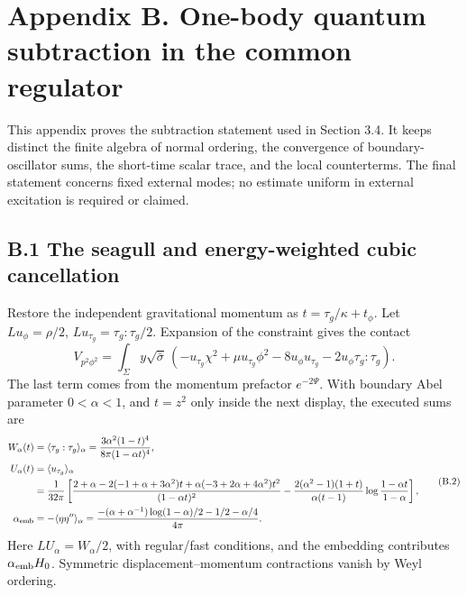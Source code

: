 \clearpage
\hypertarget{appendix-b.-one-body-quantum-subtraction-in-the-common-regulator}{%
\section{Appendix B. One-body quantum subtraction in the common regulator}\label{appendix-b.-one-body-quantum-subtraction-in-the-common-regulator}}

This appendix proves the subtraction statement used in Section 3.4. It keeps distinct the finite algebra of normal ordering, the convergence of boundary-oscillator sums, the short-time scalar trace, and the local counterterms. The final statement concerns fixed external modes; no estimate uniform in external excitation is required or claimed.

\hypertarget{b.1-the-seagull-and-energy-weighted-cubic-cancellation}{%
\subsection{B.1 The seagull and energy-weighted cubic cancellation}\label{b.1-the-seagull-and-energy-weighted-cubic-cancellation}}

Restore the independent gravitational momentum as \(t=\tau_g/\kappa+t_\phi\). Let \(Lu_\phi=\rho/2\), \(Lu_{\tau_g}=\tau_g:\tau_g/2\). Expansion of the constraint gives the contact \[
V_{p^2\phi^2}
=\int_\Sigma y\sqrt{\bar\sigma}\,
(-u_{\tau_g}\chi^2+\mu u_{\tau_g}\phi^2
-8u_\phi u_{\tau_g}-2u_\phi\tau_g:\tau_g).
\tag{B.1}
\] The last term comes from the momentum prefactor \(e^{-2\Psi}\). With boundary Abel parameter \(0<\alpha<1\), and \(t=z^2\) only inside the next display, the executed sums are \begingroup
\small
\[
\begin{aligned}
W_\alpha(t)&=\langle\tau_g:\tau_g\rangle_\alpha
=\frac{3\alpha^2(1-t)^4}{8\pi(1-\alpha t)^4},\\
U_\alpha(t)&=\langle u_{\tau_g}\rangle_\alpha\\
&=\frac1{32\pi}\left[
\frac{2+\alpha-2(-1+\alpha+3\alpha^2)t
+\alpha(-3+2\alpha+4\alpha^2)t^2}{(1-\alpha t)^2}
-\frac{2(\alpha^2-1)(1+t)}{\alpha(t-1)}
\log\frac{1-\alpha t}{1-\alpha}\right],\\
\alpha_{\rm emb}
&=-\langle\eta\eta''\rangle_\alpha
=\frac{-(\alpha+\alpha^{-1})\log(1-\alpha)/2-1/2-\alpha/4}
{4\pi}.
\end{aligned}
\tag{B.2}
\]
\endgroup Here \(LU_\alpha=W_\alpha/2\), with regular/fast conditions, and the embedding contributes \(\alpha_{\rm emb}H_0\). Symmetric displacement--momentum contractions vanish by Weyl ordering.

